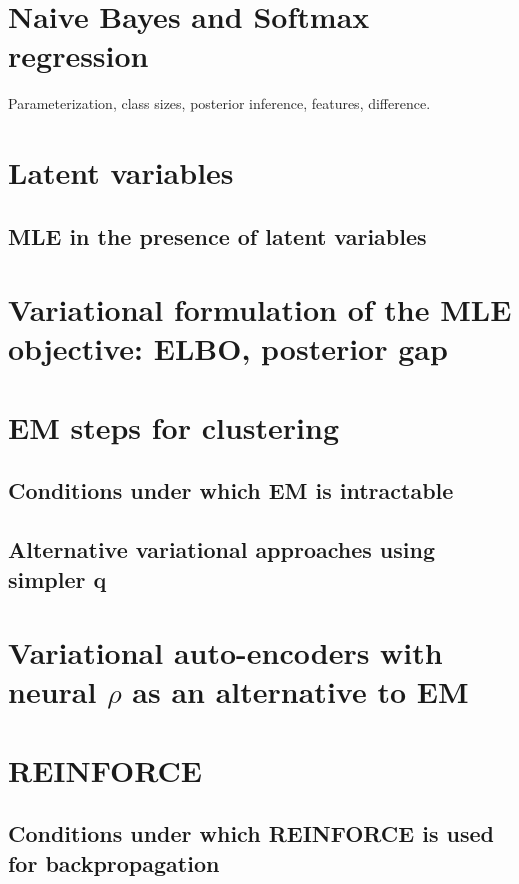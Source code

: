\documentclass[11pt]{article}
\begin{document}
\section{Naive Bayes and Softmax regression}

Parameterization, class sizes, posterior inference, features, difference.

\section{Latent variables}

\subsection{MLE in the presence of latent variables}

\section{Variational formulation of the MLE objective: ELBO, posterior gap}

\section{EM steps for clustering}

\subsection{Conditions under which EM is intractable}
\subsection{Alternative variational approaches using simpler q}

\section{Variational auto-encoders with neural $\rho$ as an alternative to EM}

\section{REINFORCE}

\subsection{Conditions under which REINFORCE is used for backpropagation}



\end{document}
